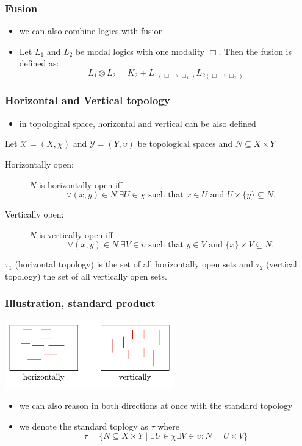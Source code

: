 \documentclass[hyperref={pdfpagelabels=false},t,10pt]{beamer}
\begin{document}
\begin{frame}
  \frametitle{Fusion}
  \begin{itemize}
    \item we can also combine logics with fusion
    \item Let $L_1$ and $L_2$ be modal logics with one modality $\Box$. Then the fusion is defined as:
    $$ L_1 \otimes L_2 = K_2 + L_{1(\Box \rightarrow \Box_1)} L_{2(\Box \rightarrow \Box_2)} $$ 

  \end{itemize}

\end{frame}

\begin{frame}
  \frametitle{Horizontal and Vertical topology}
  \begin{itemize}
    \item in topological space, horizontal and vertical can be also defined 
  \end{itemize}
  Let \( \mathcal{X} = (X, \chi) \) and \( \mathcal{Y} = (Y, \upsilon) \) be topological spaces and \( N \subseteq X \times Y \) \newline

\begin{description}
  \item[Horizontally open:] \(N\) is horizontally open iff 
  \[
    \forall (x, y) \in N\; \exists U \in \chi \text{ such that } x \in U \text{ and } U \times \{y\} \subseteq N.
  \]

  \item[Vertically open:] \(N\) is vertically open iff 
  \[
    \forall (x, y) \in N\; \exists V \in \upsilon \text{ such that } y \in V \text{ and } \{x\} \times V \subseteq N.
  \]

\end{description}

$\tau_1$ (horizontal topology) is the set of all horizontally open sets and $\tau_2$ (vertical topology) the set of all vertically open sets.


\end{frame}

\begin{frame}
  \frametitle{Illustration, standard product}
    \centering
    \includegraphics[width=0.55\textwidth]{Example4.pdf}
  \begin{itemize}
    \item we can also reason in both directions at once with the standard topology
    \item we denote the standard toplogy as $\tau$ where 
    $$\tau = \{N \subseteq X \times Y \mid \exists U \in \chi \exists V \in \upsilon: N = U \times V\}$$  
  \end{itemize}

\end{frame}
\end{document}
